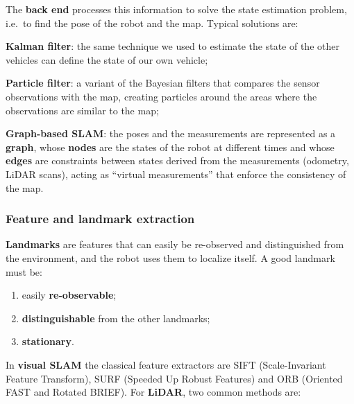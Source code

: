 The \textbf{back end} processes this information to solve the state estimation problem, i.e.\ to find the pose of the robot and the map. Typical solutions are:
\begin{compactitemize}
    \item \textbf{Kalman filter}: the same technique we used to estimate the state of the other vehicles can define the state of our own vehicle;
    \item \textbf{Particle filter}: a variant of the Bayesian filters that compares the sensor observations with the map, creating particles around the areas where the observations are similar to the map;
    \item \textbf{Graph-based SLAM}: the poses and the measurements are represented as a \textbf{graph}, whose \textbf{nodes} are the states of the robot at different times and whose \textbf{edges} are constraints between states derived from the measurements (odometry, LiDAR scans), acting as ``virtual measurements'' that enforce the consistency of the map.
\end{compactitemize}

\subsubsection{Feature and landmark extraction}
\textbf{Landmarks} are features that can easily be re-observed and distinguished from the environment, and the robot uses them to localize itself. A good landmark must be:
\begin{enumerate}
    \item easily \textbf{re-observable};
    \item \textbf{distinguishable} from the other landmarks;
    \item \textbf{stationary}.
\end{enumerate}

In \textbf{visual SLAM} the classical feature extractors are SIFT (Scale-Invariant Feature Transform), SURF (Speeded Up Robust Features) and ORB (Oriented FAST and Rotated BRIEF).
For \textbf{LiDAR}, two common methods are:


